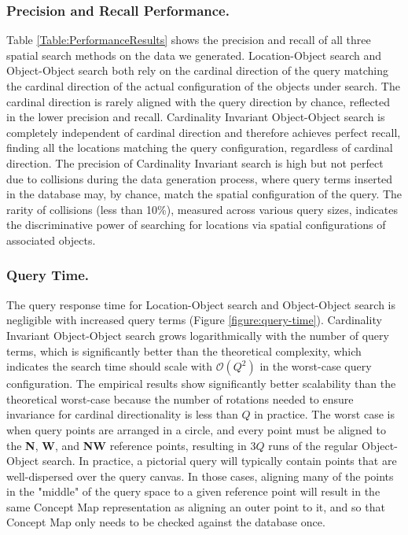 \subsubsection{Precision and Recall Performance.} 
Table \ref{Table:PerformanceResults} shows the precision and recall of all three spatial search methods on the data we generated.
Location-Object search and Object-Object search both rely on the cardinal direction of the query matching the cardinal direction of the actual configuration of the objects under search.
The cardinal direction is rarely aligned with the query direction by chance, reflected in the lower precision and recall.
Cardinality Invariant Object-Object search is completely independent of cardinal direction and therefore achieves perfect recall, finding all the locations matching the query configuration, regardless of cardinal direction.
The precision of Cardinality Invariant search is high but not perfect due to collisions during the data generation process, where query terms inserted in the database may, by chance, match the spatial configuration of the query.
The rarity of collisions (less than 10\%), measured across various query sizes, indicates the discriminative power of searching for locations via spatial configurations of associated objects.

\subsubsection{Query Time.}
The query response time for Location-Object search and Object-Object search is negligible with increased query terms (Figure \ref{figure:query-time}).
Cardinality Invariant Object-Object search grows logarithmically with the number of query terms, which is significantly better than the theoretical complexity, which indicates the search time should scale with $\mathcal{O}(Q^2)$ in the worst-case query configuration.
The empirical results show significantly better scalability than the theoretical worst-case because the number of rotations needed to ensure invariance for cardinal directionality is less than $Q$ in practice. 
The worst case is when query points are arranged in a circle, and every point must be aligned to the \textbf{N}, \textbf{W}, and \textbf{NW} reference points, resulting in $3Q$ runs of the regular Object-Object search.
In practice, a pictorial query will typically contain points that are well-dispersed over the query canvas.
In those cases, aligning many of the points in the "middle" of the query space to a given reference point will result in the same Concept Map representation as aligning an outer point to it, and so that Concept Map only needs to be checked against the database once.


